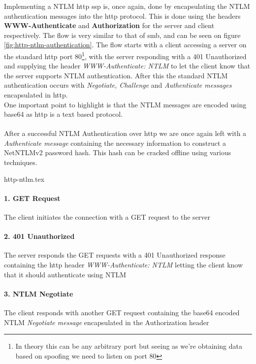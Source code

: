 \documentclass{article}
\begin{document}
\subsubsection{}
Implementing a NTLM \gls{http} \gls{ssp} is, once again, done by encapsulating the NTLM authentication messages into the \gls{http} protocol. This is done using the headers \textbf{WWW-Authenticate} and \textbf{Authorization} for the server and client respectively. The flow is very similar to that of \gls{smb}, and can be seen on figure \ref{fig:http-ntlm-authentication}. The flow starts with a client accessing a server on the standard \gls{http} port 80\footnote{In theory this can be any arbitrary port but seeing as we're obtaining data based on spoofing we need to listen on port 80}, with the server responding with a 401 Unauthorized and supplying the header \emph{WWW-Authenticate: NTLM} to let the client know that the server supports NTLM authentication. After this the standard NTLM authentication occurs with \emph{Negotiate, Challenge} and \emph{Authenticate messages} encapsulated in \gls{http}. \\
One important point to highlight is that the NTLM messages are encoded using base64 as \gls{http} is a text based protocol.
\\\\
After a successful NTLM Authentication over \gls{http} we are once again left with a \emph{Authenticate message} containing the necessary information to construct a NetNTLMv2 password hash. This hash can be cracked offline using various techniques.

{http-ntlm.tex}
\paragraph{1. GET Request} The client initiates the connection with a GET request to the server
\paragraph{2. 401 Unauthorized} The server responds the GET requests with a 401 Unauthorized response containing the \gls{http} header \emph{WWW-Authenticate: NTLM} letting the client know that it should authenticate using NTLM
\paragraph{3. NTLM Negotiate} The client responds with another GET request containing the base64 encoded NTLM \emph{Negotiate message} encapsulated in the Authorization header
\end{document}
